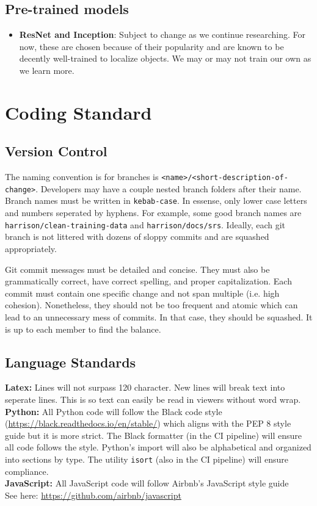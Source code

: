 \documentclass{article}
\begin{document}
\subsection{Pre-trained models}
\begin{itemize}
  \item \textbf{ResNet and Inception}: Subject to change as we continue researching. For now, these
    are chosen because of their popularity and are known to be decently well-trained to localize
    objects. We may or may not train our own as we learn more.
\end{itemize}


\section{Coding Standard}

\subsection{Version Control}
The naming convention is for branches is \verb|<name>/<short-description-of-change>|. 
Developers may have a couple nested branch folders after their name. Branch names must be written
in \verb|kebab-case|. In essense, only lower case letters and numbers seperated by hyphens.
For example, some good branch names are \verb|harrison/clean-training-data| and
\verb|harrison/docs/srs|. Ideally, each git branch is not littered with dozens of sloppy commits 
and are squashed appropriately.

Git commit messages must be detailed and concise. They must also be grammatically correct, have
correct spelling, and proper capitalization. Each commit must contain one specific change and not 
span multiple (i.e. high cohesion). Nonetheless, they should not be too frequent and atomic which
can lead to an unnecessary mess of commits. In that case, they should be squashed. It is up to 
each member to find the balance.

\subsection{Language Standards}
\textbf{Latex:} Lines will not surpass 120 character. New lines will break text into 
seperate lines. This is so text can easily be read in viewers without word wrap.\\
\textbf{Python:} All Python code will follow the Black code style \\
(\url{https://black.readthedocs.io/en/stable/}) which aligns with the PEP 8 style guide but it is
more strict. The Black formatter (in the CI pipeline) will ensure all code follows the style.
Python's import will also be alphabetical and organized into sections by type. The utility 
\verb|isort| (also in the CI pipeline) will ensure compliance.\\
\textbf{JavaScript:} All JavaScript code will follow Airbnb's JavaScript style guide\\
See here: \url{https://github.com/airbnb/javascript}\\
\end{document}
